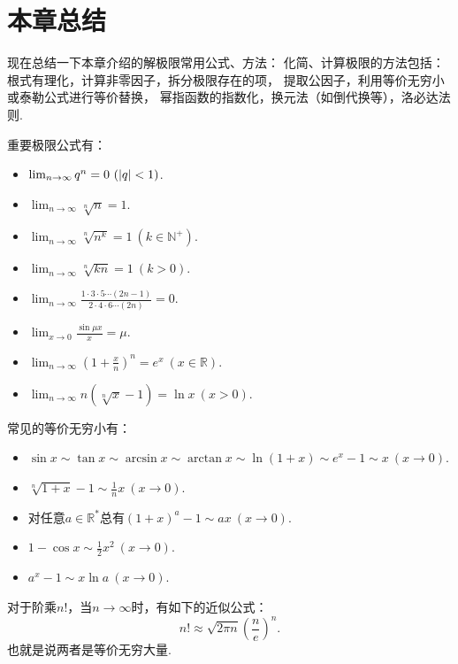 \section{本章总结}
现在总结一下本章介绍的解极限常用公式、方法：
化简、计算极限的方法包括：
根式有理化，计算非零因子，拆分极限存在的项，
提取公因子，利用等价无穷小或泰勒公式进行等价替换，
幂指函数的指数化，换元法（如倒代换等），洛必达法则.

重要极限公式有：
\begin{itemize}
	\item \(\lim_{n\to\infty} q^n=0\ (\abs{q}<1)\).
	\item \(\lim_{n\to\infty} \sqrt[n]{n}=1\).
	\item \(\lim_{n\to\infty} \sqrt[n]{n^k}=1\ (k\in\mathbb{N}^+)\).
	\item \(\lim_{n\to\infty} \sqrt[n]{k n} = 1\ (k>0)\).
	\item \(\lim_{n\to\infty} \frac{1 \cdot 3 \cdot 5 \dotsm (2n-1)}{2 \cdot 4 \cdot 6 \dotsm (2n)} = 0\).
	\item \(\lim_{x\to0} \frac{\sin \mu x}{x}=\mu\).
	\item \(\lim_{n\to\infty} \left(1+\frac{x}{n}\right)^n=e^x\ (x\in\mathbb{R})\).
	\item \(\lim_{n\to\infty} n\left(\sqrt[n]{x}-1\right)=\ln x\ (x>0)\).
\end{itemize}

常见的等价无穷小有：
\begin{itemize}
	\item \(\sin x
		\sim \tan x
		\sim \arcsin x
		\sim \arctan x
		\sim \ln(1+x)
		\sim e^x-1
		\sim x\ (x\to0)\).
	\item \(\sqrt[n]{1+x} - 1 \sim \frac{1}{n} x\ (x\to0)\).
	\item 对任意\(a\in\mathbb{R}^*\)总有\((1+x)^a-1 \sim ax\ (x\to0)\).
	\item \(1 - \cos x \sim \frac{1}{2} x^2\ (x\to0)\).
	\item \(a^x - 1 \sim x \ln a\ (x\to0)\).
\end{itemize}

\begin{theorem}[斯特林公式]\label{theorem:极限.斯特林公式}
对于阶乘\(n!\)，当\(n\to\infty\)时，有如下的近似公式：\[
n! \approx \sqrt{2 \pi n} \left( \frac{n}{e} \right)^n.
\]也就是说两者是等价无穷大量.
\end{theorem}
